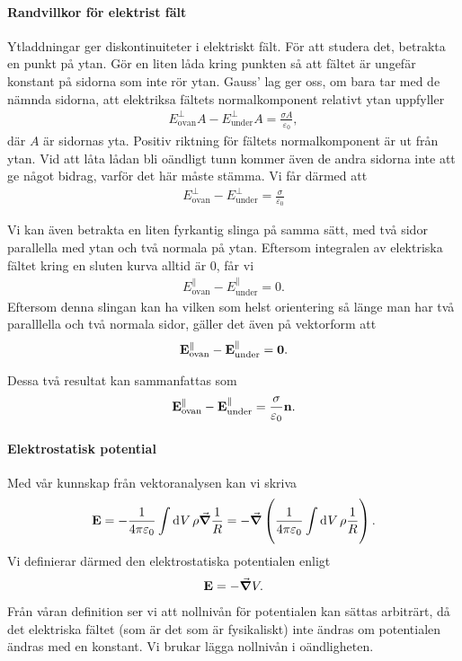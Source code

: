 \paragraph{Randvillkor för elektrist fält}
Ytladdningar ger diskontinuiteter i elektriskt fält. För att studera det, betrakta en punkt på ytan. Gör en liten låda kring punkten så att fältet är ungefär konstant på sidorna som inte rör ytan. Gauss' lag ger oss, om bara tar med de nämnda sidorna, att elektriksa fältets normalkomponent relativt ytan uppfyller
\begin{align*}
	E_{\text{ovan}}^{\perp}A - E_{\text{under}}^{\perp}A = \frac{\sigma A}{\varepsilon_{0}},
\end{align*}
där $A$ är sidornas yta. Positiv riktning för fältets normalkomponent är ut från ytan. Vid att låta lådan bli oändligt tunn kommer även de andra sidorna inte att ge något bidrag, varför det här måste stämma. Vi får därmed att
\begin{align*}
	E_{\text{ovan}}^{\perp} - E_{\text{under}}^{\perp} = \frac{\sigma}{\varepsilon_{0}}
\end{align*}

Vi kan även betrakta en liten fyrkantig slinga på samma sätt, med två sidor parallella med ytan och två normala på ytan. Eftersom integralen av elektriska fältet kring en sluten kurva alltid är $0$, får vi
\begin{align*}
	E_{\text{ovan}}^{\parallel} - E_{\text{under}}^{\parallel} = 0.
\end{align*}
Eftersom denna slingan kan ha vilken som helst orientering så länge man har två paralllella och två normala sidor, gäller det även på vektorform att
\begin{align*}
	\vb{E}_{\text{ovan}}^{\parallel} - \vb{E}_{\text{under}}^{\parallel} = \vb{0}.
\end{align*}

Dessa två resultat kan sammanfattas som
\begin{align*}
	\vb{E}_{\text{ovan}}^{\parallel} - \vb{E}_{\text{under}}^{\parallel} = \frac{\sigma}{\varepsilon_{0}}\vb{n}.
\end{align*}

\paragraph{Elektrostatisk potential}
Med vår kunnskap från vektoranalysen kan vi skriva
\begin{align*}
	\vb{E} = -\frac{1}{4\pi\varepsilon_{0}}\int\limits_{}^{}\dd[]{V}\rho\grad{\frac{1}{R}} = -\grad{\left(\frac{1}{4\pi\varepsilon_{0}}\int\limits_{}^{}\dd[]{V}\rho\frac{1}{R}\right)}.
\end{align*}
Vi definierar därmed den elektrostatiska potentialen enligt
\begin{align*}
	\vb{E} = -\grad{V}.
\end{align*}
Från våran definition ser vi att nollnivån för potentialen kan sättas arbiträrt, då det elektriska fältet (som är det som är fysikaliskt) inte ändras om potentialen ändras med en konstant. Vi brukar lägga nollnivån i oändligheten.

